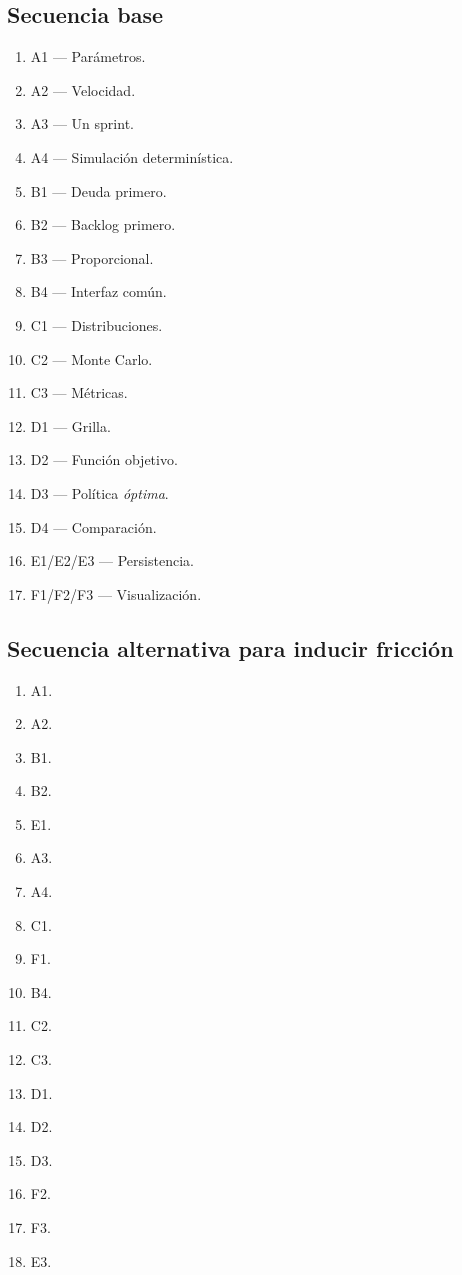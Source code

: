 \documentclass[11pt,a4paper]{article}
\begin{document}
\subsection{Secuencia base}

\begin{enumerate}[leftmargin=*]
    \item A1 --- Par\'ametros.
    \item A2 --- Velocidad.
    \item A3 --- Un sprint.
    \item A4 --- Simulaci\'on determin\'istica.
    \item B1 --- Deuda primero.
    \item B2 --- Backlog primero.
    \item B3 --- Proporcional.
    \item B4 --- Interfaz com\'un.
    \item C1 --- Distribuciones.
    \item C2 --- Monte Carlo.
    \item C3 --- M\'etricas.
    \item D1 --- Grilla.
    \item D2 --- Funci\'on objetivo.
    \item D3 --- Pol\'itica \textit{\'optima}.
    \item D4 --- Comparaci\'on.
    \item E1/E2/E3 --- Persistencia.
    \item F1/F2/F3 --- Visualizaci\'on.
\end{enumerate}

\subsection{Secuencia alternativa para inducir fricci\'on}

\begin{enumerate}[leftmargin=*]
    \item A1.
    \item A2.
    \item B1.
    \item B2.
    \item E1.
    \item A3.
    \item A4.
    \item C1.
    \item F1.
    \item B4.
    \item C2.
    \item C3.
    \item D1.
    \item D2.
    \item D3.
    \item F2.
    \item F3.
    \item E3.
\end{enumerate}
\end{document}
